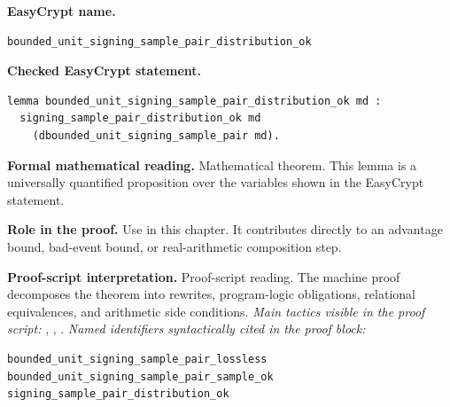 \begin{formaltheorem}
\noindent\textbf{EasyCrypt name.}
\begin{lstlisting}[language=EasyCrypt,basicstyle=\ttfamily\scriptsize]
bounded_unit_signing_sample_pair_distribution_ok
\end{lstlisting}
\noindent\textbf{Checked EasyCrypt statement.}
\begin{lstlisting}[language=EasyCrypt,basicstyle=\ttfamily\scriptsize]
lemma bounded_unit_signing_sample_pair_distribution_ok md :
  signing_sample_pair_distribution_ok md
    (dbounded_unit_signing_sample_pair md).
\end{lstlisting}
\noindent\textbf{Formal mathematical reading.}
Mathematical theorem. This lemma is a universally quantified proposition over the variables shown in the EasyCrypt statement.

\noindent\textbf{Role in the proof.}
Use in this chapter. It contributes directly to an advantage bound, bad-event bound, or real-arithmetic composition step.

\noindent\textbf{Proof-script interpretation.}
Proof-script reading. The machine proof decomposes the theorem into rewrites, program-logic obligations, relational equivalences, and arithmetic side conditions.
\emph{Main tactics visible in the proof script:} , , .
\emph{Named identifiers syntactically cited in the proof block:}
\begin{lstlisting}[language=EasyCrypt,basicstyle=\ttfamily\scriptsize]
bounded_unit_signing_sample_pair_lossless
bounded_unit_signing_sample_pair_sample_ok
signing_sample_pair_distribution_ok
\end{lstlisting}

\end{formaltheorem}

